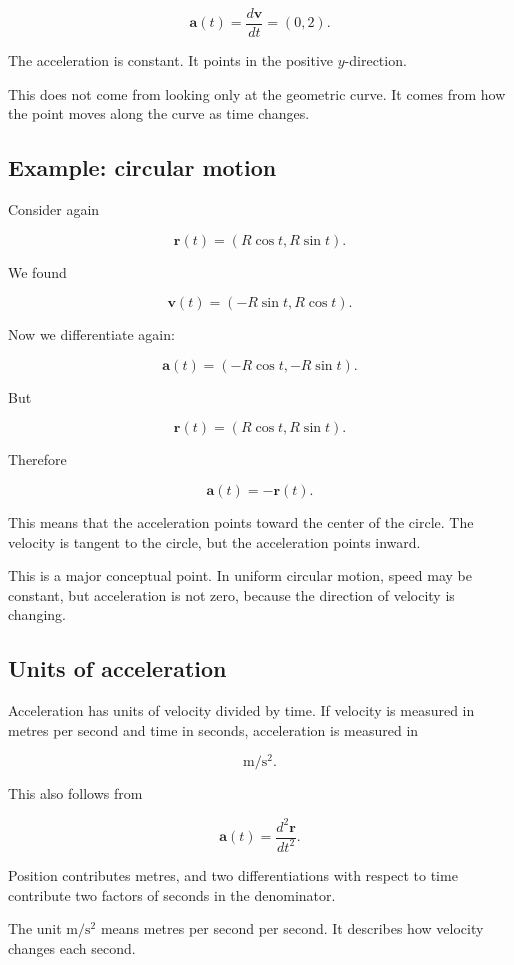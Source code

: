 \[
\mathbf{a}(t)
=
\frac{d\mathbf{v}}{dt}
=
(0,2).
\]

The acceleration is constant. It points in the positive \(y\)-direction.

This does not come from looking only at the geometric curve. It comes from how the point moves along the curve as time changes.

\subsection{Example: circular motion}

Consider again

\[
\mathbf{r}(t)=(R\cos t,R\sin t).
\]

We found

\[
\mathbf{v}(t)=(-R\sin t,R\cos t).
\]

Now we differentiate again:

\[
\mathbf{a}(t)
=
(-R\cos t,-R\sin t).
\]

But

\[
\mathbf{r}(t)=(R\cos t,R\sin t).
\]

Therefore

\[
\mathbf{a}(t)=-\mathbf{r}(t).
\]

This means that the acceleration points toward the center of the circle. The velocity is tangent to the circle, but the acceleration points inward.

This is a major conceptual point. In uniform circular motion, speed may be constant, but acceleration is not zero, because the direction of velocity is changing.

\subsection{Units of acceleration}

Acceleration has units of velocity divided by time. If velocity is measured in metres per second and time in seconds, acceleration is measured in

\[
\mathrm{m/s^2}.
\]

This also follows from

\[
\mathbf{a}(t)=\frac{d^2\mathbf{r}}{dt^2}.
\]

Position contributes metres, and two differentiations with respect to time contribute two factors of seconds in the denominator.

The unit \(\mathrm{m/s^2}\) means metres per second per second. It describes how velocity changes each second.

